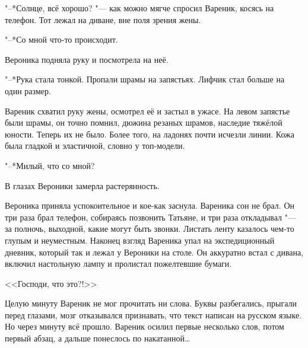 "--*Солнце, всё хорошо? "--- как можно мягче спросил Вареник, косясь на телефон.
Тот лежал на диване, вне поля зрения жены.

"--*Со мной что-то происходит.

Вероника подняла руку и посмотрела на неё.

"--*Рука стала тонкой.
Пропали шрамы на запястьях.
Лифчик стал больше на один размер.

Вареник схватил руку жены, осмотрел её и застыл в ужасе.
На левом запястье были шрамы, он точно помнил, дюжина резаных шрамов, наследие тяжёлой юности.
Теперь их не было.
Более того, на ладонях почти исчезли линии.
Кожа была гладкой и эластичной, словно у топ-модели.

"--*Милый, что со мной?

В глазах Вероники замерла растерянность.

\asterism

\label{Sun_2012_07_08}

Вероника приняла успокоительное и кое-как заснула.
Вареника сон не брал.
Он три раза брал телефон, собираясь позвонить Татьяне, и три раза откладывал "--- за полночь, выходной, какие могут быть звонки.
Листать ленту казалось чем-то глупым и неуместным.
Наконец взгляд Вареника упал на экспедиционный дневник, который так и лежал у Вероники на столе.
Он аккуратно встал с дивана, включил настольную лампу и пролистал пожелтевшие бумаги.

<<Господи, что это?!>>

Целую минуту Вареник не мог прочитать ни слова.
Буквы разбегались, прыгали перед глазами, мозг отказывался признавать, что текст написан на русском языке.
Но через минуту всё прошло.
Вареник осилил первые несколько слов, потом первый абзац, а дальше понеслось по накатанной\dots{}



